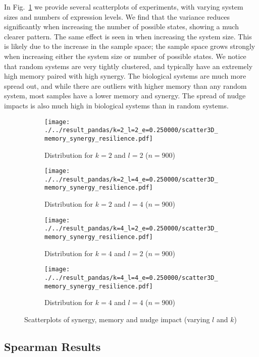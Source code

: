 \documentclass[../main.tex]{subfiles}
\begin{document}
In Fig.~\ref{fig:3dscatter} we provide several scatterplots of experiments, with varying system sizes and numbers of expression levels.
We find that the variance reduces significantly when increasing the number of possible states, showing a much clearer pattern.
The same effect is seen in when increasing the system size.
This is likely due to the increase in the sample space; the sample space grows strongly when increasing either the system size or number of possible states.
We notice that random systems are very tightly clustered, and typically have an extremely high memory paired with high synergy.
The biological systems are much more spread out, and while there are outliers with higher memory than any random system, most samples have a lower memory and synergy.
The spread of nudge impacts is also much high in biological systems than in random systems.

\begin{figure}[H]
    \centering
    \begin{subfigure}[b]{0.45\textwidth}
        \texttt{[image: ./../result\_pandas/k=2\_l=2\_e=0.250000/scatter3D\_memory\_synergy\_resilience.pdf]}
        \caption{Distribution for $k=2$ and $l=2$ ($n=900$)}
    \end{subfigure}
    \begin{subfigure}[b]{0.45\textwidth}
        \texttt{[image: ./../result\_pandas/k=2\_l=4\_e=0.250000/scatter3D\_memory\_synergy\_resilience.pdf]}
        \caption{Distribution for $k=2$ and $l=4$ ($n=900$)}
    \end{subfigure}
\bigskip
    \begin{subfigure}[b]{0.45\textwidth}
        \texttt{[image: ./../result\_pandas/k=4\_l=2\_e=0.250000/scatter3D\_memory\_synergy\_resilience.pdf]}
        \caption{Distribution for $k=4$ and $l=2$ ($n=900$)}
    \end{subfigure}
    \begin{subfigure}[b]{0.45\textwidth}
        \texttt{[image: ./../result\_pandas/k=4\_l=4\_e=0.250000/scatter3D\_memory\_synergy\_resilience.pdf]}
        \caption{Distribution for $k=4$ and $l=4$ ($n=900$)}
    \end{subfigure}
    \caption{Scatterplots of synergy, memory and nudge impact (varying $l$ and $k$)}
    \label{fig:3dscatter}
\end{figure}

\subsection{Spearman Results}
\end{document}
